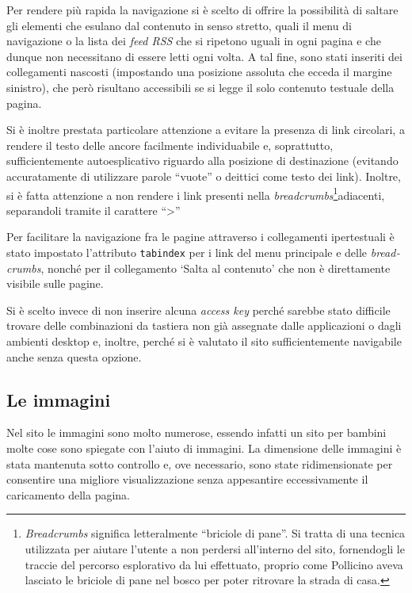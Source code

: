 \documentclass[10pt,a4paper,onecolumn]{article}
\newcommand{\inglese}[1]{\foreignlanguage{english}{\itshape{}#1}}
\begin{document}
Per rendere più rapida la navigazione si è scelto di offrire la possibilità di saltare gli elementi che esulano dal contenuto in senso stretto, quali il menu di navigazione o la lista dei \inglese{feed RSS} che si ripetono uguali in ogni pagina e che dunque non necessitano di essere letti ogni volta. A tal fine, sono stati inseriti dei collegamenti nascosti (impostando una posizione assoluta che ecceda il margine sinistro), che però risultano accessibili se si legge il solo contenuto testuale della pagina.

Si è inoltre prestata particolare attenzione a evitare la presenza di link circolari, a rendere il testo delle ancore facilmente individuabile e, soprattutto, sufficientemente autoesplicativo riguardo alla posizione di destinazione (evitando accuratamente di utilizzare parole ``vuote'' o deittici come testo dei link).
Inoltre, si è fatta attenzione a non rendere i link presenti nella \inglese{breadcrumbs}\footnote{%
   \inglese{Breadcrumbs} significa letteralmente ``briciole di pane''. Si tratta di una tecnica utilizzata per aiutare l'utente a non perdersi all'interno del sito, fornendogli le traccie del percorso esplorativo da lui effettuato, proprio come Pollicino aveva lasciato le briciole di pane nel bosco per poter ritrovare la strada di casa.}adiacenti, separandoli tramite il carattere ``>''

Per facilitare la navigazione fra le pagine attraverso i collegamenti ipertestuali è stato impostato l'attributo \texttt{tabindex} per i link del menu principale e delle \inglese{breadcrumbs}, nonché per il collegamento `Salta al contenuto' che non è direttamente visibile sulle pagine.

Si è scelto invece di non inserire alcuna \inglese{access key} perché sarebbe stato difficile trovare delle combinazioni da tastiera non già assegnate dalle applicazioni o dagli ambienti desktop e, inoltre, perché si è valutato il sito sufficientemente navigabile anche senza questa opzione.

\subsection{Le immagini}
Nel sito le immagini sono molto numerose, essendo infatti un sito per bambini molte cose sono spiegate con l'aiuto di immagini. La dimensione delle immagini è stata mantenuta sotto controllo e, ove necessario, sono state ridimensionate per consentire una migliore visualizzazione senza appesantire eccessivamente il caricamento della pagina.
\end{document}
